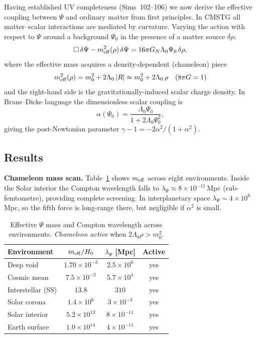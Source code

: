 \documentclass[12pt,a4paper]{article}
\begin{document}
Having established UV completeness (Sims~102--106) we now derive the
effective coupling between $\Psi$ and ordinary matter from first principles.
In CMSTG all matter--scalar interactions are mediated by curvature.  Varying
the action with respect to $\Psi$ around a background $\Psi_0$ in the
presence of a matter source $\delta\rho$:
\begin{equation}
  \Box\,\delta\Psi - m_{\rm eff}^2(\rho)\,\delta\Psi
  = 16\pi G_N \Lambda_0 \Psi_0\,\delta\rho ,
  \label{eq:dPsi}
\end{equation}
where the effective mass acquires a density-dependent (chameleon) piece
\begin{equation}
  m_{\rm eff}^2(\rho) = m_0^2 + 2\Lambda_0\,|R| \approx m_0^2 + 2\Lambda_0\,\rho
  \quad (8\pi G=1)
\end{equation}
and the right-hand side is the gravitationally-induced scalar charge density.
In Brans--Dicke language the dimensionless scalar coupling is
\begin{equation}
  \alpha(\Psi_0) = \frac{\Lambda_0\Psi_0}{1 + 2\Lambda_0\Psi_0^2} ,
\end{equation}
giving the post-Newtonian parameter $\gamma-1 = -2\alpha^2/(1+\alpha^2)$.

\subsection{Results}

\textbf{Chameleon mass scan.}
Table~\ref{tab:sim107_env} shows $m_{\rm eff}$ across eight environments.
Inside the Solar interior the Compton wavelength falls to
$\lambda_\Psi \approx 8\times10^{-11}$\,Mpc (sub-femtometre), providing
complete screening.  In interplanetary space $\lambda_\Psi \sim 4\times10^6$\,Mpc,
so the fifth force is long-range there, but negligible if $\alpha^2$ is small.

\begin{table}[h]
\centering
\caption{Effective $\Psi$ mass and Compton wavelength across environments.
\textit{Chameleon active} when $2\Lambda_0\rho > m_0^2$.}
\label{tab:sim107_env}
\begin{tabular}{lccc}
\hline
Environment & $m_{\rm eff}/H_0$ & $\lambda_\Psi$ [Mpc] & Active \\
\hline
Deep void              & $1.70\times10^{-3}$ & $2.5\times10^{6}$ & yes \\
Cosmic mean            & $7.5\times10^{-2}$  & $5.7\times10^{4}$ & yes \\
Interstellar (SS)      & $13.8$              & $310$             & yes \\
Solar corona           & $1.4\times10^{6}$   & $3\times10^{-3}$  & yes \\
Solar interior         & $5.2\times10^{13}$  & $8\times10^{-11}$ & yes \\
Earth surface          & $1.0\times10^{14}$  & $4\times10^{-11}$ & yes \\
\hline
\end{tabular}
\end{table}
\end{document}
